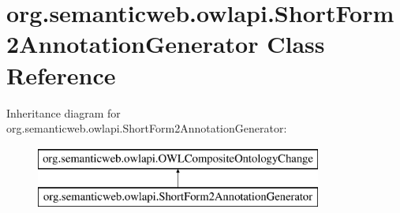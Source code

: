 \hypertarget{classorg_1_1semanticweb_1_1owlapi_1_1_short_form2_annotation_generator}{\section{org.\-semanticweb.\-owlapi.\-Short\-Form2\-Annotation\-Generator Class Reference}
\label{classorg_1_1semanticweb_1_1owlapi_1_1_short_form2_annotation_generator}
}
Inheritance diagram for org.\-semanticweb.\-owlapi.\-Short\-Form2\-Annotation\-Generator\-:\begin{figure}[H]
\begin{center}
\leavevmode
\includegraphics[height=2.000000cm]{classorg_1_1semanticweb_1_1owlapi_1_1_short_form2_annotation_generator}
\end{center}
\end{figure}
